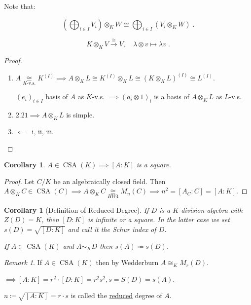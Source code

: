 \documentclass{article}
\theoremstyle{definition}
\theoremstyle{plain}
\newtheorem{corollary}[theorem]{Corollary}
\theoremstyle{remark}
\newtheorem*{remark*}{Remark}
\begin{document}
    Note that:

    \[
        \left( \bigoplus_{i\in I} V_i \right) \otimes_K W \cong \bigoplus_{i\in I} \left( V_i \otimes_K W \right) \;.
    \]

    \[
        K \otimes_K V \xrightarrow{\cong} V, \quad \lambda \otimes v \mapsto \lambda v \;.
    \]

    \begin{proof}
        \begin{enumerate}[label=\roman*)]
            \item \(A \underset{K\text{-v.s.}}{\cong} K^{(I)} \implies A \otimes_K L \cong K^{(I)} \otimes_K L \cong (K \otimes_K L)^{(I)}\cong L^{(I)}\).
            
            \((e_i)_{i\in I}\) basis of \(A\) as \(K\)-v.s. \(\implies (a_i \otimes 1)_i\) is a basis of \(A \otimes_K L\) as \(L\)-v.s.

            \item[iii)] \(2.21 \implies A \otimes_K L\) is simple.
            
            \item[iv)] \(\impliedby\) i, ii, iii.
        \end{enumerate} 
    \end{proof}

    \begin{corollary}
        \(A \in \operatorname{CSA}(K) \implies [A:K]\) is a square.
    \end{corollary}

    \begin{proof}
        Let \(C / K\) be an algebraically closed field. Then \(A \otimes_K C \in \operatorname{CSA}(C) \implies A \otimes_K C \underset{HW4}{\cong} M_n(C) \implies n^2 = [A_C : C] = [A:K]\).
    \end{proof}

    \begin{corollary}
        [Definition of Reduced Degree]
        If \(D\) is a \(K\)-division algebra with \(Z(D) = K\), then \([D:K]\) is infinite or a square. In the latter case we set \(s(D) = \sqrt{[D:K]}\) and call it the Schur index of \(D\).

        If \(A \in \operatorname{CSA}(K)\) and \(A \sim_K D\) then \(s(A) \coloneqq s(D)\). 
    \end{corollary}

    \begin{remark*}
        If \(A\in \operatorname{CSA}(K)\) then by Wedderburn \(A \cong_K M_r(D)\).

        \(\implies [A:K] = r^2 \cdot [D:K] = r^2 s^2, s = S(D) = s(A)\).

        \(n \coloneqq \sqrt{[A:K]} = r \cdot s\) is called the \underline{reduced} degree of \(A\). 
    \end{remark*}
\end{document}
